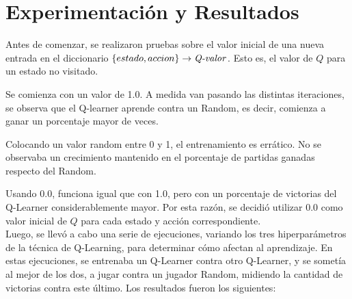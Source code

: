 \section{Experimentación y Resultados}
Antes de comenzar, se realizaron pruebas sobre el valor inicial de una nueva entrada en el diccionario $\{estado, accion\} \rightarrow \text{\emph{Q-valor}}$. Esto es, el valor de $Q$ para un estado no visitado.

Se comienza con un valor de 1.0. A medida van pasando las distintas iteraciones, se observa que el Q-learner aprende contra un Random, es decir, comienza a ganar un porcentaje mayor de veces.

Colocando un valor random entre 0 y 1, el entrenamiento es errático. No se observaba un crecimiento mantenido en el porcentaje de partidas ganadas respecto del Random.

Usando 0.0, funciona igual que con 1.0, pero con un porcentaje de victorias del Q-Learner considerablemente mayor.
Por esta raz\'on, se decidi\'o utilizar 0.0 como valor inicial de $Q$ para cada estado y acci\'on correspondiente.\\

Luego, se llev\'o a cabo una serie de ejecuciones, variando los tres hiperpar\'ametros de la t\'ecnica de Q-Learning, para determinar c\'omo afectan al aprendizaje. 
En estas ejecuciones, se entrenaba un Q-Learner contra otro Q-Learner, y se somet\'ia al mejor de los dos, a jugar contra un jugador Random, midiendo la cantidad de victorias contra este \'ultimo. Los resultados fueron los siguientes:

